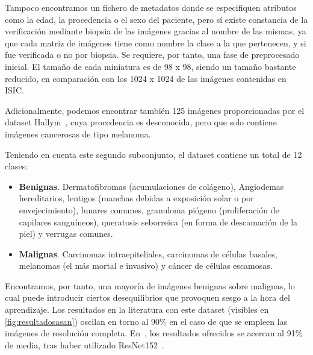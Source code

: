 Tampoco encontramos un fichero de metadatos donde se especifiquen atributos como la edad, la procedencia o el sexo del paciente, pero sí existe constancia de la verificación mediante biopsia de las imágenes gracias al nombre de las mismas, ya que cada matriz de imágenes tiene como nombre la clase a la que pertenecen, y si fue verificada o no por biopsia. Se requiere, por tanto, una fase de preprocesado inicial. El tamaño de cada miniatura es de 98 x 98, siendo un tamaño bastante reducido, en comparación con los 1024 x 1024 de las imágenes contenidas en ISIC.

Adicionalmente, podemos encontrar también 125 imágenes proporcionadas por el dataset Hallym~\cite{Han2017}, cuya procedencia es desconocida, pero que solo contiene imágenes cancerosas de tipo melanoma.

Teniendo en cuenta este segundo subconjunto, el dataset contiene un total de 12 clases:
\begin{itemize}
	\item \textbf{Benignas}. Dermatofibromas (acumulaciones de colágeno), Angiodemas hereditarios, lentigos (manchas debidas a exposición solar o por envejecimiento), lunares comunes, granuloma piógeno (proliferación de capilares sanguíneos), queratosis seborreica (en forma de descamación de la piel) y verrugas comunes.
	 \item \textbf{Malignas}. Carcinomas intraepiteliales, carcinomas de células basales, melanomas (el más mortal e invasivo) y cáncer de células escamosas.
\end{itemize}

Encontramos, por tanto, una mayoría de imágenes benignas sobre malignas, lo cual puede introducir ciertos desequilibrios que provoquen sesgo a la hora del aprendizaje. Los resultados en la literatura con este dataset (visibles en \ref{fig:resultadosasan}) oscilan en torno al 90\% en el caso de que se empleen las imágenes de resolución completa. En~\cite{HAN20189}, los resultados ofrecidos se acercan al 91\% de media, tras haber utilizado ResNet152~\cite{he2015deep}.


